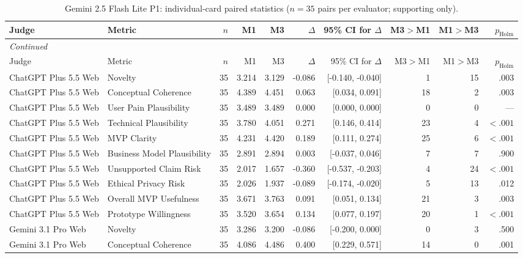 \documentclass[10pt]{article}
\begin{document}
\begin{landscape}
\small
\setlength{\LTcapwidth}{\textwidth}
\begin{longtable}{llrrrrrrrr}
\caption{Gemini 2.5 Flash Lite P1: individual-card paired statistics ($n=35$ pairs per evaluator; supporting only).}\label{tab:s9-ind25p1}\\
\toprule
Judge & Metric & $n$ & M1 & M3 & $\Delta$ & 95\% CI for $\Delta$ & M3$>$M1 & M1$>$M3 & $p_{\mathrm{Holm}}$ \\
\midrule\endfirsthead
\multicolumn{10}{l}{\small\itshape Continued}\\
\toprule Judge & Metric & $n$ & M1 & M3 & $\Delta$ & 95\% CI for $\Delta$ & M3$>$M1 & M1$>$M3 & $p_{\mathrm{Holm}}$ \\ \midrule\endhead
\bottomrule\endfoot
ChatGPT Plus 5.5 Web & Novelty & 35 & 3.214 & 3.129 & -0.086 & [-0.140, -0.040] & 1 & 15 & .003 \\
ChatGPT Plus 5.5 Web & Conceptual Coherence & 35 & 4.389 & 4.451 & 0.063 & [0.034, 0.091] & 18 & 2 & .003 \\
ChatGPT Plus 5.5 Web & User Pain Plausibility & 35 & 3.489 & 3.489 & 0.000 & [0.000, 0.000] & 0 & 0 & — \\
ChatGPT Plus 5.5 Web & Technical Plausibility & 35 & 3.780 & 4.051 & 0.271 & [0.146, 0.414] & 23 & 4 & $<.001$ \\
ChatGPT Plus 5.5 Web & MVP Clarity & 35 & 4.231 & 4.420 & 0.189 & [0.111, 0.274] & 25 & 6 & $<.001$ \\
ChatGPT Plus 5.5 Web & Business Model Plausibility & 35 & 2.891 & 2.894 & 0.003 & [-0.037, 0.046] & 7 & 7 & .900 \\
ChatGPT Plus 5.5 Web & Unsupported Claim Risk & 35 & 2.017 & 1.657 & -0.360 & [-0.537, -0.203] & 4 & 24 & $<.001$ \\
ChatGPT Plus 5.5 Web & Ethical Privacy Risk & 35 & 2.026 & 1.937 & -0.089 & [-0.174, -0.020] & 5 & 13 & .012 \\
ChatGPT Plus 5.5 Web & Overall MVP Usefulness & 35 & 3.671 & 3.763 & 0.091 & [0.051, 0.134] & 21 & 3 & .003 \\
ChatGPT Plus 5.5 Web & Prototype Willingness & 35 & 3.520 & 3.654 & 0.134 & [0.077, 0.197] & 20 & 1 & $<.001$ \\
Gemini 3.1 Pro Web & Novelty & 35 & 3.286 & 3.200 & -0.086 & [-0.200, 0.000] & 0 & 3 & .500 \\
Gemini 3.1 Pro Web & Conceptual Coherence & 35 & 4.086 & 4.486 & 0.400 & [0.229, 0.571] & 14 & 0 & .001 \\

\end{longtable}
\end{landscape}
\end{document}
